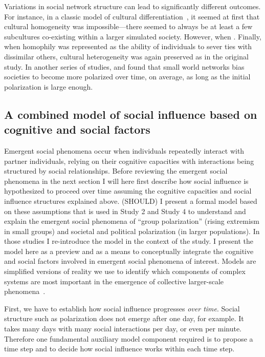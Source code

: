 \documentclass[12pt,letterpaper]{article}
\begin{document}
Variations in social network structure can lead to significantly different
outcomes. For instance, in a classic model of cultural differentiation~\cite{Axelrod1997},
it seemed at first that cultural homogeneity was impossible---there seemed to
always be at least a few subcultures co-existing within a larger simulated
society. However, when . Finally, when homophily was represented
as the ability of individuals to sever ties with dissimilar others, cultural
heterogeneity was again preserved as in the original study. In another series
of studies,  and  found that small world
networks bias societies to become more polarized over time, on average, 
as long as the initial polarization is large enough. 


\subsection{A combined model of social influence based on cognitive and social factors}

Emergent social phenomena occur when individuals repeatedly interact with
partner individuals, relying on their cognitive capacities
with interactions being structured by social relationships. Before
reviewing the emergent social phenomena in the next section I 
will here first describe how social influence is hypothesized to proceed over
time assuming the cognitive capacities and social influence structures 
explained above. (SHOULD) I present a formal model based on these assumptions
that is used in Study 2 and Study 4 to understand and explain the emergent 
social phenomena of ``group polarization'' (rising extremism in small groups) 
and societal and political polarization (in larger populations). In those studies
I re-introduce the model in the context of the study. I present the model
here as a preview and as a means to conceptually integrate the cognitive and
social factors involved in emergent social phenomena of interest. Models are
simplified versions of reality we use to identify which components of
complex systems are most important in the emergence of collective larger-scale
phenomena~\cite{Wimsatt1972,Wimsatt1997,Machamer2000,Wimsatt2007,Smaldino2017}.

First, we have to establish how social influence progresses \emph{over time}.
Social structure such as polarization does not emerge after one day, for example.
It takes many days with many social interactions per day, or even per minute.
Therefore one fundamental auxiliary model component required is to propose
a time step and to decide how social influence works within each time step.
\end{document}
